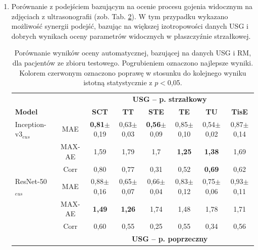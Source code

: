 \begin{enumerate}
\begin{table}[h!]
\begin{center}
\begin{tabular}{lc||c|c|c|c|c|c}
 		\end{tabular}
 	\end{center}
 	\label{tab:end-to-end_testset}
 \end{table}
\vspace{-1cm}
 \item Porównanie z podejściem bazującym na ocenie procesu gojenia widocznym \linebreak na zdjęciach z ultrasonografii (zob. Tab. \ref{tab:USGvsRM-cross-validation}). W tym przypadku wykazano możliwość synergii podejść, bazując na większej izotropowości danych USG i dobrych wynikach oceny parametrów widocznych w płaszczyźnie strzałkowej.
 \vspace{0.3cm}
 \begin{table}[h!]
 	\tiny
 	\setlength{\tabcolsep}{1pt}
 	\caption{Porównanie wyników oceny automatycznej, bazującej na danych USG i RM, dla pacjentów ze zbioru testowego. Pogrubieniem oznaczono najlepsze wyniki. Kolorem czerwonym oznaczono poprawę w stosunku do kolejnego wyniku istotną statystycznie z $p$$<$0,05.}
 	\label{tab:USGvsRM-cross-validation}
 	\vspace{-0.3cm}
 	\hspace*{3.5em}\begin{tabular}{lc||c|c|c|c|c|c}
 		& & \multicolumn{6}{c}{\textbf{USG -- p. strzałkowy}} \\
 		\textbf{Model} & & \textbf{SCT} & \textbf{TT} & \textbf{STE} & \textbf{TE} & \textbf{TU} & \textbf{TisE} \\ \hline \hline
 		Inception-v3$_{eus}$ & MAE & \textbf{0,81}$\pm$0,19 & 0,63$\pm$0,03 & \textbf{0,56}$\pm$0,09 & 0,85$\pm$0,10 & 0,54$\pm$0,02 & 0,87$\pm$0,14 \\
 		& MAX-AE & 1,59 & 1,79 & 1,7 & \textbf{1,25} & \textbf{1,38} & 1,69 \\
 		& Corr & 0,80 & 0,77 & 0,31 & 0,52 & \textbf{0,69} & 0,62 \\ \hline
 		ResNet-50$_{eus}$ & MAE & 0,88$\pm$0,16 & 0,65$\pm$0,07 & 0,66$\pm$0,04 & 0,83$\pm$0,12 & 0,75$\pm$0,06 & 0,93$\pm$0,11 \\
 		& MAX-AE & \textbf{1,49} & \textbf{1,26} & 1,74 & 1,48 & 1,78 & 1,71 \\
 		& Corr & 0,60 & 0,55 & 0,25 & 0,55 & 0,34 & 0,56 \\
 		\hline \hline
 		& & \multicolumn{6}{c}{\textbf{USG -- p. poprzeczny}} \\
 		

\end{tabular}
\end{table}
\end{enumerate}
